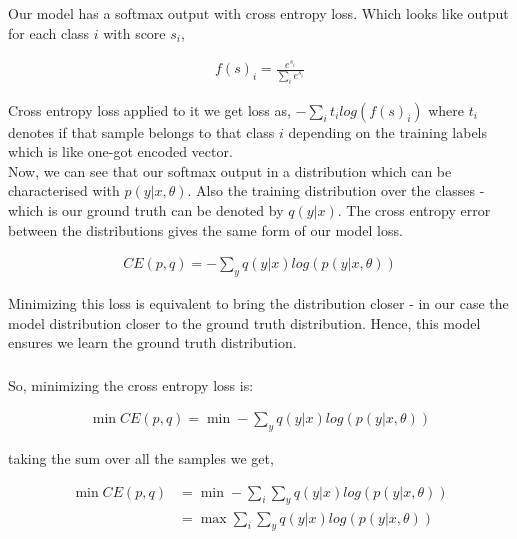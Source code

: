\documentclass{article}
\begin{document}
\subsubsection{}

Our model has a softmax output with cross entropy loss. Which looks like output for each class $i$ with score $s_i$,

\begin{align*}
    f(s)_{i} = \frac{e^{s_{i}}}{\sum_{i}e^{s_{i}}}
\end{align*}

Cross entropy loss applied to it we get loss as, $-\sum_{i}t_{i}log(f(s)_{i})$ where $t_i$ denotes if that sample belongs to that class $i$ depending on the training labels which is like one-got encoded vector.\\

Now, we can see that our softmax output in a distribution which can be characterised with $p(y|x,\theta)$. Also the training distribution over the classes - which is our ground truth can be denoted by $q(y|x)$. The cross entropy error between the distributions gives the same form of our model loss. 

\begin{align*}
    CE(p,q) = -\sum_{y}q(y|x)log(p(y|x,\theta))
\end{align*}

Minimizing this loss is equivalent to bring the distribution closer - in our case the model distribution closer to the ground truth distribution. Hence, this model ensures we learn the ground truth distribution.

\subsubsection{}

So, minimizing the cross entropy loss is:

\begin{align*}
    \min CE(p,q) = \min -\sum_{y}q(y|x)log(p(y|x,\theta))
\end{align*}

taking the sum over all the samples we get,

\begin{align*}
    \min CE(p,q) &= \min -\sum_{i}\sum_{y}q(y|x)log(p(y|x,\theta))\\
    &= \max\sum_{i}\sum_{y}q(y|x)log(p(y|x,\theta))\\
\end{align*}
\end{document}
